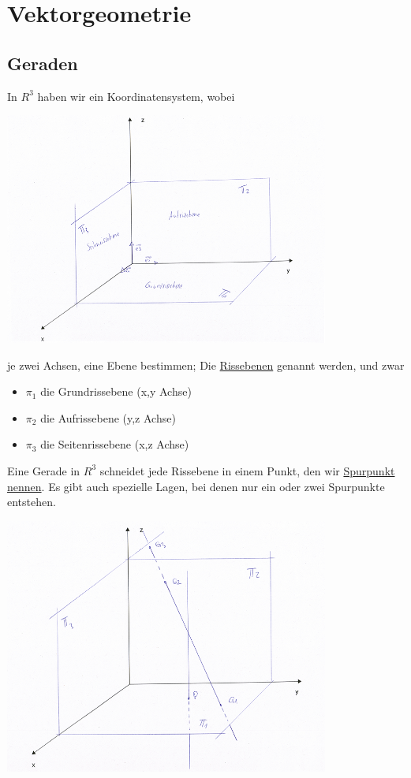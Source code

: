 
\chapter{Vektorgeometrie}

\section{Geraden}
In $R^3$ haben wir ein Koordinatensystem, wobei
\begin{center}
	 \includegraphics[width=0.8\textwidth]{imgs/rissebene.png}
 \end{center}
je zwei Achsen, eine Ebene bestimmen; Die \underline{Rissebenen} genannt werden, und zwar
\begin{itemize}
	\item
		$\pi_1$ die Grundrissebene (x,y Achse)
	\item 
		$\pi_2$ die Aufrissebene (y,z Achse)
	\item
		$\pi_3$ die Seitenrissebene (x,z Achse)
\end{itemize}
Eine Gerade in $R^3$ schneidet jede Rissebene in einem Punkt, den wir \underline{Spurpunkt nennen}.
Es gibt auch spezielle Lagen, bei denen nur ein oder zwei Spurpunkte entstehen.
\begin{center}
	 \includegraphics[width=0.8\textwidth]{imgs/spurpunkte.png}
 \end{center}
